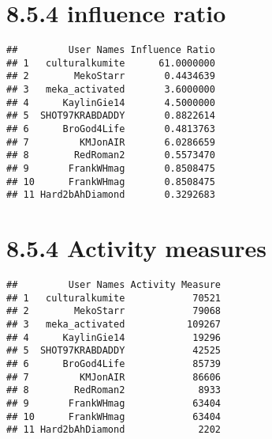 \documentclass[]{article}
\newenvironment{Shaded}{\begin{snugshade}}{\end{snugshade}}
\newcommand{\KeywordTok}[1]{\textcolor[rgb]{0.13,0.29,0.53}{\textbf{#1}}}
\newcommand{\StringTok}[1]{\textcolor[rgb]{0.31,0.60,0.02}{#1}}
\newcommand{\OperatorTok}[1]{\textcolor[rgb]{0.81,0.36,0.00}{\textbf{#1}}}
\newcommand{\NormalTok}[1]{#1}
\begin{document}
\section{8.5.4 influence ratio}\label{influence-ratio}

\begin{Shaded}
\end{Shaded}

\begin{verbatim}
##         User Names Influence Ratio
## 1   culturalkumite      61.0000000
## 2        MekoStarr       0.4434639
## 3   meka_activated       3.6000000
## 4      KaylinGie14       4.5000000
## 5  SHOT97KRABDADDY       0.8822614
## 6      BroGod4Life       0.4813763
## 7         KMJonAIR       6.0286659
## 8        RedRoman2       0.5573470
## 9       FrankWHmag       0.8508475
## 10      FrankWHmag       0.8508475
## 11 Hard2bAhDiamond       0.3292683
\end{verbatim}

\section{8.5.4 Activity measures}\label{activity-measures}

\begin{Shaded}
\end{Shaded}

\begin{verbatim}
##         User Names Activity Measure
## 1   culturalkumite            70521
## 2        MekoStarr            79068
## 3   meka_activated           109267
## 4      KaylinGie14            19296
## 5  SHOT97KRABDADDY            42525
## 6      BroGod4Life            85739
## 7         KMJonAIR            86606
## 8        RedRoman2             8933
## 9       FrankWHmag            63404
## 10      FrankWHmag            63404
## 11 Hard2bAhDiamond             2202
\end{verbatim}
\end{document}
